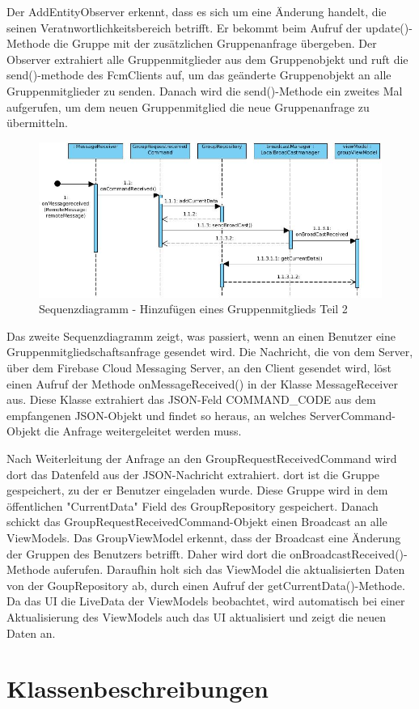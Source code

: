 Der AddEntityObserver erkennt, dass es sich um eine Änderung handelt, die seinen Veratnwortlichkeitsbereich betrifft. Er bekommt beim Aufruf der update()-Methode die Gruppe mit der zusätzlichen Gruppenanfrage übergeben. Der Observer extrahiert alle Gruppenmitglieder aus dem Gruppenobjekt und ruft die send()-methode des FcmClients auf, um das geänderte Gruppenobjekt an alle Gruppenmitglieder zu senden. Danach wird die send()-Methode ein zweites Mal aufgerufen, um dem neuen Gruppenmitglied die neue Gruppenanfrage zu übermitteln.

\begin{figure}[H]
	\centering
	\includegraphics[width=1\textwidth]{../Sequenzdiagramme/addMember2.jpg}
	\caption{Sequenzdiagramm - Hinzufügen eines Gruppenmitglieds Teil 2}
\end{figure}

Das zweite Sequenzdiagramm zeigt, was passiert, wenn an einen Benutzer eine Gruppenmitgliedschaftsanfrage gesendet wird. Die Nachricht, die von dem Server, über dem Firebase Cloud Messaging Server, an den Client gesendet wird, löst einen Aufruf der Methode onMessageReceived() in der Klasse MessageReceiver aus. Diese Klasse extrahiert das JSON-Feld COMMAND\_CODE aus dem empfangenen JSON-Objekt und findet so heraus, an welches ServerCommand-Objekt die Anfrage weitergeleitet werden muss.

Nach Weiterleitung der Anfrage an den GroupRequestReceivedCommand wird dort das Datenfeld aus der JSON-Nachricht extrahiert. dort ist die Gruppe gespeichert, zu der er Benutzer eingeladen wurde. Diese Gruppe wird in dem öffentlichen "CurrentData" Field des GroupRepository gespeichert. Danach schickt das GroupRequestReceivedCommand-Objekt einen Broadcast an alle ViewModels. Das GroupViewModel erkennt, dass der Broadcast eine Änderung der Gruppen des Benutzers betrifft. Daher wird dort die onBroadcastReceived()-Methode auferufen. Daraufhin holt sich das ViewModel die aktualisierten Daten von der GoupRepository ab, durch einen Aufruf der getCurrentData()-Methode. Da das UI die LiveData der ViewModels beobachtet, wird automatisch bei einer Aktualisierung des ViewModels auch das UI aktualisiert und zeigt die neuen Daten an.

\section{Klassenbeschreibungen}

